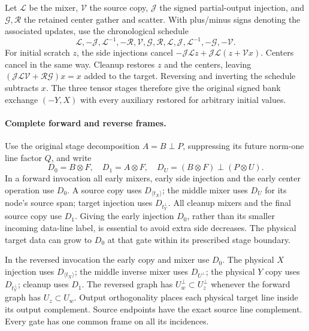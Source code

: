 Let $\mathcal L$ be the mixer, $\mathcal V$ the source copy,
$\mathcal J$ the signed partial-output injection, and $\mathcal G,\mathcal R$
the retained center gather and scatter. With plus/minus signs denoting
the associated updates, use the chronological schedule
\[
 \mathcal L,-\mathcal J,\mathcal L^{-1},-\mathcal R,
 \mathcal V,\mathcal G,\mathcal R,\mathcal L,\mathcal J,
 \mathcal L^{-1},-\mathcal G,-\mathcal V.
\]
For initial scratch $z$, the side injections cancel
$-\mathcal J\mathcal Lz+\mathcal J\mathcal L(z+\mathcal Vx)$.
Centers cancel in the same way. Cleanup restores $z$ and the centers,
leaving $(\mathcal J\mathcal L\mathcal V+\mathcal R\mathcal G)x=x$
added to the target. Reversing and inverting the schedule subtracts $x$.
The three tensor stages therefore give the original signed bank exchange
$(-Y,X)$ with every auxiliary restored for arbitrary initial values.

\paragraph{Complete forward and reverse frames.}
Use the original stage decomposition $A=B\perp P$, suppressing its future
norm-one line factor $Q$, and write
\[
 D_0=B\otimes F,\quad D_1=A\otimes F,\quad
 D_U=(B\otimes F)\perp(P\otimes U).
\]
In a forward invocation all early mixers, early side injection and the early
center operation use $D_0$. A source copy uses $D_{\langle t_X\rangle}$;
the middle mixer uses $D_U$ for its node's source span; target injection
uses $D_{t_Y^\perp}$. All cleanup mixers and the final source copy use $D_1$.
Giving the early injection $D_0$, rather than its smaller incoming data-line
label, is essential to avoid extra side decreases. The physical target data
can grow to $D_0$ at that gate within its prescribed stage boundary.

In the reversed invocation the early copy and mixer use $D_0$. The physical
$X$ injection uses $D_{\langle t_X\rangle}$; the middle inverse mixer uses
$D_{U^\perp}$; the physical $Y$ copy uses $D_{t_Y^\perp}$; cleanup uses $D_1$.
The reversed graph has $U_w^\perp\subset U_z^\perp$ whenever the forward
graph has $U_z\subset U_w$. Output orthogonality places each physical target
line inside its output complement. Source endpoints have the exact source
line complement. Every gate has one common frame on all its incidences.

